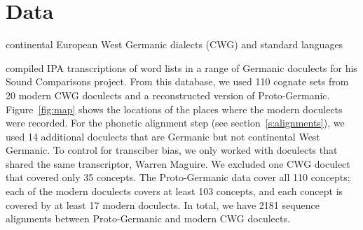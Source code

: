 \documentclass[a4paper]{article}
\begin{document}


\newpage
\section{Data}

continental European West Germanic dialects (CWG) and standard languages

\citet{heggarty2018sound} compiled IPA transcriptions of word lists
in a range of Germanic doculects for his Sound Comparisons project.
From this database,
we used 110 cognate sets from 20 modern CWG doculects
and a reconstructed version of Proto-Germanic.
Figure~\ref{fig:map} shows the locations of the places
where the modern doculects were recorded.
For the phonetic alignment step (see section~\ref{s:alignments}),
we used 14 additional doculects that are Germanic but not continental West Germanic. 
To control for transciber bias, we only worked with doculects that shared the same transcriptor, Warren Maguire.
We excluded one CWG doculect that covered only 35 concepts. %
The Proto-Germanic data cover all 110 concepts; each of the modern doculects covers at least 103 concepts, and each concept is covered by at least 17 modern doculects.
In total, we have 2181 sequence alignments between Proto-Germanic and modern CWG doculects.
\end{document}
